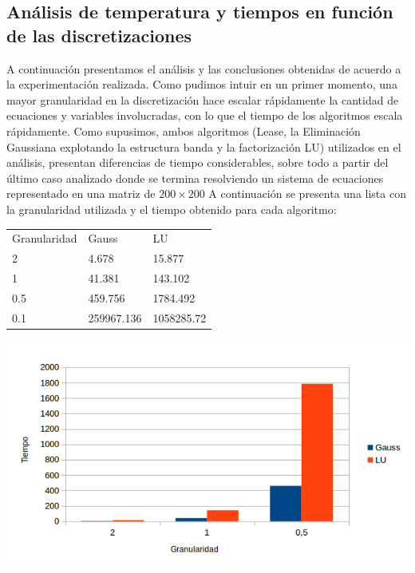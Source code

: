 \subsection{An\'alisis de temperatura y tiempos en funci\'on de las discretizaciones}
A continuaci\'on presentamos el an\'alisis y las conclusiones obtenidas de acuerdo a la experimentaci\'on realizada.
Como pudimos intuir en un primer momento, una mayor granularidad en la discretizaci\'on hace escalar r\'apidamente la cantidad de ecuaciones y variables involucradas, con lo que el tiempo de los algoritmos escala r\'apidamente. Como supusimos, ambos algoritmos (Lease, la Eliminaci\'on Gaussiana explotando la estructura banda y la factorizaci\'on LU) utilizados en el an\'alisis,  presentan diferencias de tiempo considerables, sobre todo a partir del \'ultimo caso analizado donde se termina resolviendo un sistema de ecuaciones representado en una matriz de $200 \times 200$
A continuaci\'on se presenta una lista con la granularidad utilizada y el tiempo obtenido para cada algoritmo:


\begin{table}[h]
\begin{tabular}{lll}
Granularidad & Gauss & LU \\
2 & 4.678 & 15.877 \\
1 & 41.381 & 143.102 \\
0.5 & 459.756 & 1784.492 \\
0.1 & 259967.136 & 1058285.72 \\
\end{tabular}
\end{table}



\begin{center}
 \includegraphics[width=400pt]{imagenes/grafico.png}
\end{center}



